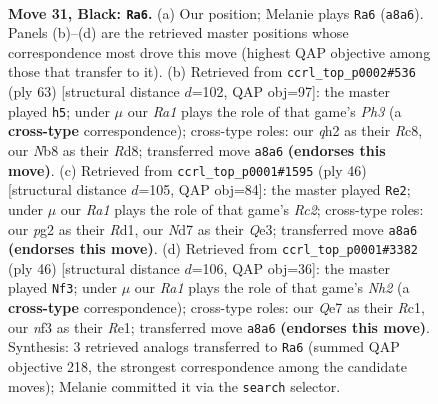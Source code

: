\documentclass[11pt]{article}
\begin{document}
\clearpage

\begin{figure}[p]\centering
\begin{subfigure}{0.46\textwidth}\centering
\resizebox{\linewidth}{!}{%
\newchessgame
\chessboard[
  setfen={rn3rk1/2pnq2p/1p2p1p1/p3Pp2/P2P1P1P/1RP2NN1/2K3PQ/5R2 b - - 4 31},
  showmover=false,
  pgfstyle=straightmove, color=movearrow, markmove={a8-a6}
]}
\caption{}
\end{subfigure}\hfill
\begin{subfigure}{0.46\textwidth}\centering
\resizebox{\linewidth}{!}{%
\newchessgame
\chessboard[
  setfen={2rr2k1/4qp2/pp1ppnpp/2n5/P1P1P3/1PN2PP1/3RN1KP/3QR3 b - - 11 32},
  showmover=false,
  pgfstyle=straightmove, color=movearrow, markmove={h6-h5}
]}
\caption{}
\end{subfigure}
\\[4pt]
\begin{subfigure}{0.46\textwidth}\centering
\resizebox{\linewidth}{!}{%
\newchessgame
\chessboard[
  setfen={2r1r1k1/2qn1pp1/pp1ppn1p/8/P1PNP3/1PN1QPP1/2R3KP/3R4 w - - 3 24},
  showmover=false,
  pgfstyle=straightmove, color=movearrow, markmove={c2-e2}
]}
\caption{}
\end{subfigure}\hfill
\begin{subfigure}{0.46\textwidth}\centering
\resizebox{\linewidth}{!}{%
\newchessgame
\chessboard[
  setfen={1r2r3/1p2qpk1/p1p2np1/2Np1n2/PP1P3p/4P2P/2Q2PPN/2R1R1K1 w - - 1 24},
  showmover=false,
  pgfstyle=straightmove, color=movearrow, markmove={h2-f3}
]}
\caption{}
\end{subfigure}
\caption{\textbf{Move 31, Black: \texttt{Ra6}.} (a) Our position; Melanie plays \texttt{Ra6} (\texttt{a8a6}). Panels (b)--(d) are the retrieved master positions whose correspondence most drove this move (highest QAP objective among those that transfer to it). (b) Retrieved from \texttt{ccrl\_top\_p0002\#536} (ply 63) [structural distance $d$=102, QAP obj=97]: the master played \texttt{h5}; under $\mu$ our \emph{Ra1} plays the role of that game's \emph{Ph3} (a \textbf{cross-type} correspondence); cross-type roles: our \emph{q}h2 as their \emph{R}c8, our \emph{N}b8 as their \emph{R}d8; transferred move \texttt{a8a6} \textbf{(endorses this move)}. (c) Retrieved from \texttt{ccrl\_top\_p0001\#1595} (ply 46) [structural distance $d$=105, QAP obj=84]: the master played \texttt{Re2}; under $\mu$ our \emph{Ra1} plays the role of that game's \emph{Rc2}; cross-type roles: our \emph{p}g2 as their \emph{R}d1, our \emph{N}d7 as their \emph{Q}e3; transferred move \texttt{a8a6} \textbf{(endorses this move)}. (d) Retrieved from \texttt{ccrl\_top\_p0001\#3382} (ply 46) [structural distance $d$=106, QAP obj=36]: the master played \texttt{Nf3}; under $\mu$ our \emph{Ra1} plays the role of that game's \emph{Nh2} (a \textbf{cross-type} correspondence); cross-type roles: our \emph{Q}e7 as their \emph{R}c1, our \emph{n}f3 as their \emph{R}e1; transferred move \texttt{a8a6} \textbf{(endorses this move)}. Synthesis: 3 retrieved analogs transferred to \texttt{Ra6} (summed QAP objective 218, the strongest correspondence among the candidate moves); Melanie committed it via the \texttt{search} selector.}
\label{fig:thought-m61}
\end{figure}
\end{document}

